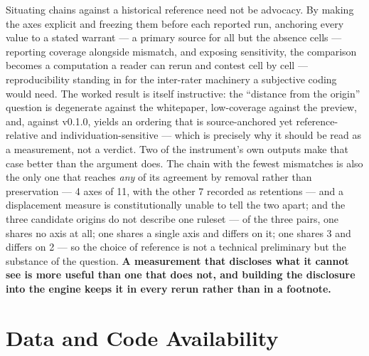 \documentclass[
]{article}
\begin{document}
Situating chains against a historical reference need not be advocacy. By
making the axes explicit and freezing them before each reported run,
anchoring every value to a stated warrant --- a primary source for all
but the absence cells --- reporting coverage alongside mismatch, and
exposing sensitivity, the comparison becomes a computation a reader can
rerun and contest cell by cell --- reproducibility standing in for the
inter-rater machinery a subjective coding would need. The worked result
is itself instructive: the ``distance from the origin'' question is
degenerate against the whitepaper, low-coverage against the preview,
and, against v0.1.0, yields an ordering that is source-anchored yet
reference-relative and individuation-sensitive --- which is precisely
why it should be read as a measurement, not a verdict. Two of the
instrument's own outputs make that case better than the argument does.
The chain with the fewest mismatches is also the only one that reaches
\emph{any} of its agreement by removal rather than preservation --- 4
axes of 11, with the other 7 recorded as retentions --- and a
displacement measure is constitutionally unable to tell the two apart;
and the three candidate origins do not describe one ruleset --- of the
three pairs, one shares no axis at all; one shares a single axis and
differs on it; one shares 3 and differs on 2 --- so the choice of
reference is not a technical preliminary but the substance of the
question. \textbf{A measurement that discloses what it cannot see is
more useful than one that does not, and building the disclosure into the
engine keeps it in every rerun rather than in a footnote.}

\section{Data and Code Availability}\label{data-and-code-availability}
\end{document}
